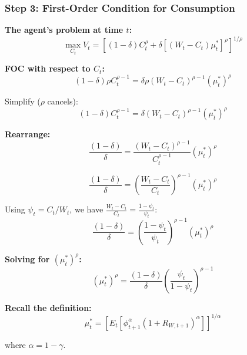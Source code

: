 \documentclass{beamer}
\begin{document}
\begin{frame}[allowframebreaks]
    \frametitle{Step 3: First-Order Condition for Consumption}
    
    \textbf{The agent's problem at time $t$:}
    \begin{equation*}
        \max_{C_t} V_t = \left[ (1-\delta)C_t^{\rho} + \delta [(W_t - C_t) \mu_t^*]^{\rho} \right]^{1/\rho}
    \end{equation*}
    
    \textbf{FOC with respect to $C_t$:}
    \begin{equation*}
        (1-\delta) \rho C_t^{\rho-1} = \delta \rho (W_t - C_t)^{\rho-1} (\mu_t^*)^{\rho}
    \end{equation*}
    
    Simplify ($\rho$ cancels):
    \begin{equation*}
        (1-\delta) C_t^{\rho-1} = \delta (W_t - C_t)^{\rho-1} (\mu_t^*)^{\rho}
    \end{equation*}
    
    \framebreak
    
    \textbf{Rearrange:}
    \begin{equation*}
        \frac{(1-\delta)}{\delta} = \frac{(W_t - C_t)^{\rho-1}}{C_t^{\rho-1}} (\mu_t^*)^{\rho}
    \end{equation*}
    
    \begin{equation*}
        \frac{(1-\delta)}{\delta} = \left(\frac{W_t - C_t}{C_t}\right)^{\rho-1} (\mu_t^*)^{\rho}
    \end{equation*}
    
    Using $\psi_t = C_t/W_t$, we have $\frac{W_t - C_t}{C_t} = \frac{1-\psi_t}{\psi_t}$:
    \begin{equation*}
        \frac{(1-\delta)}{\delta} = \left(\frac{1-\psi_t}{\psi_t}\right)^{\rho-1} (\mu_t^*)^{\rho}
    \end{equation*}
    
    \framebreak
    
    \textbf{Solving for $(\mu_t^*)^{\rho}$:}
    \begin{equation*}
        (\mu_t^*)^{\rho} = \frac{(1-\delta)}{\delta} \left(\frac{\psi_t}{1-\psi_t}\right)^{\rho-1}
    \end{equation*}
    
    \textbf{Recall the definition:}
    \begin{equation*}
        \mu_t^* = \left[ E_t[\phi_{t+1}^{\alpha} (1 + R_{W,t+1})^{\alpha}] \right]^{1/\alpha}
    \end{equation*}
    
    where $\alpha = 1 - \gamma$.
\end{frame}
\end{document}
